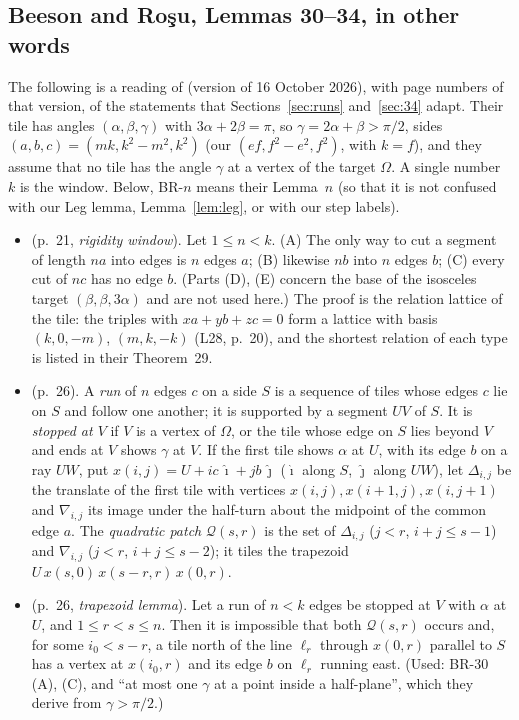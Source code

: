 \documentclass[11pt,reqno]{amsart}
\theoremstyle{plain}
\theoremstyle{definition}
\begin{document}
\subsection{Beeson and Ro\c{s}u, Lemmas 30--34, in other words}\label{sub:BR}
The following is a reading of \cite{BeesonRosu} (version of 16 October 2026), with page numbers of that version, of the statements that Sections~\ref{sec:runs} and~\ref{sec:34} adapt. Their tile has angles $(\alpha,\beta,\gamma)$ with $3\alpha+2\beta=\pi$, so $\gamma=2\alpha+\beta>\pi/2$, sides $(a,b,c)=(mk,k^2-m^2,k^2)$ (our $(ef,f^2-e^2,f^2)$, with $k=f$), and they assume that no tile has the angle $\gamma$ at a vertex of the target $\Omega$. A single number $k$ is the window. Below, BR-$n$ means their Lemma~$n$ (so that it is not confused with our Leg lemma, Lemma~\ref{lem:leg}, or with our step labels).
\begin{itemize}
\item[\textbf{BR-30}] (p.~21, \emph{rigidity window}). Let $1\le n<k$. (A) The only way to cut a segment of length $na$ into edges is $n$ edges $a$; (B) likewise $nb$ into $n$ edges $b$; (C) every cut of $nc$ has no edge $b$. (Parts (D), (E) concern the base of the isosceles target $(\beta,\beta,3\alpha)$ and are not used here.) The proof is the relation lattice of the tile: the triples with $xa+yb+zc=0$ form a lattice with basis $(k,0,-m)$, $(m,k,-k)$ (L28, p.~20), and the shortest relation of each type is listed in their Theorem~29.
\item[\textbf{Def.~11.1}] (p.~26). A \emph{run} of $n$ edges $c$ on a side $S$ is a sequence of tiles whose edges $c$ lie on $S$ and follow one another; it is supported by a segment $UV$ of $S$. It is \emph{stopped at $V$} if $V$ is a vertex of $\Omega$, or the tile whose edge on $S$ lies beyond $V$ and ends at $V$ shows $\gamma$ at $V$. If the first tile shows $\alpha$ at $U$, with its edge $b$ on a ray $UW$, put $x(i,j)=U+ic\,\hat\imath+jb\,\hat\jmath$ ($\hat\imath$ along $S$, $\hat\jmath$ along $UW$), let $\Delta_{i,j}$ be the translate of the first tile with vertices $x(i,j),x(i+1,j),x(i,j+1)$ and $\nabla_{i,j}$ its image under the half-turn about the midpoint of the common edge $a$. The \emph{quadratic patch} $\mathcal Q(s,r)$ is the set of $\Delta_{i,j}$ ($j<r$, $i+j\le s-1$) and $\nabla_{i,j}$ ($j<r$, $i+j\le s-2$); it tiles the trapezoid $U\,x(s,0)\,x(s-r,r)\,x(0,r)$.
\item[\textbf{BR-32}] (p.~26, \emph{trapezoid lemma}). Let a run of $n<k$ edges be stopped at $V$ with $\alpha$ at $U$, and $1\le r<s\le n$. Then it is impossible that both $\mathcal Q(s,r)$ occurs and, for some $i_0<s-r$, a tile north of the line $\ell_r$ through $x(0,r)$ parallel to $S$ has a vertex at $x(i_0,r)$ and its edge $b$ on $\ell_r$ running east. (Used: BR-30 (A), (C), and ``at most one $\gamma$ at a point inside a half-plane'', which they derive from $\gamma>\pi/2$.)

\end{itemize}
\end{document}
